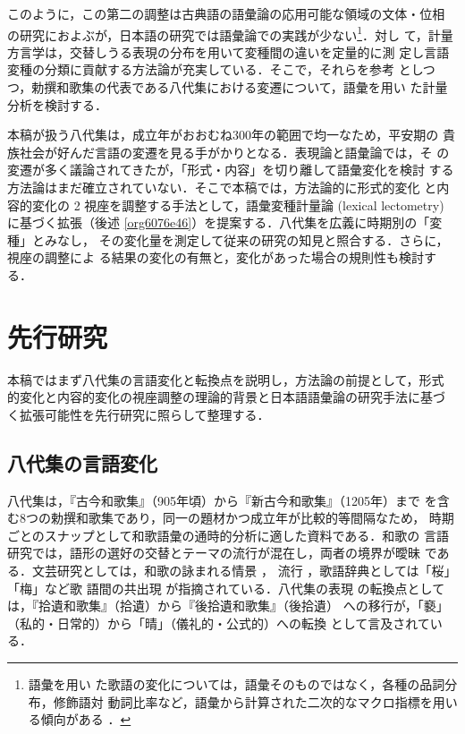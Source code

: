 \documentclass[submit]{ipsj}
\renewcommand{\ref}{\cref}
\begin{document}
このように，この第二の調整は古典語の語彙論の応用可能な領域の文体・位相
の研究におよぶが，日本語の研究では語彙論での実践が少ない\footnote{語彙を用い
た歌語の変化については，語彙そのものではなく，各種の品詞分布，修飾語対
動詞比率など，語彙から計算された二次的なマクロ指標を用いる傾向がある
\cite{tsuji1998Uta,nishihata1992Waka,hatano1941Waka}．}．対し
て，計量方言学は，交替しうる表現の分布を用いて変種間の違いを定量的に測
定し言語変種の分類に貢献する方法論が充実している．そこで，それらを参考
としつつ，勅撰和歌集の代表である八代集における変遷について，語彙を用い
た計量分析を検討する．

本稿が扱う八代集は，成立年がおおむね300年の範囲で均一なため，平安期の
貴族社会が好んだ言語の変遷を見る手がかりとなる．表現論と語彙論では，そ
の変遷が多く議論されてきたが，「形式・内容」を切り離して語彙変化を検討
する方法論はまだ確立されていない．そこで本稿では，方法論的に形式的変化
と内容的変化の 2 視座を調整する手法として，語彙変種計量論 (lexical
lectometry) \cite{Speelman2003Profilebased} に基づく拡張（後述
\ref{org6076e46}）を提案する．八代集を広義に時期別の「変種」とみなし，
その変化量を測定して従来の研究の知見と照合する．さらに，視座の調整によ
る結果の変化の有無と，変化があった場合の規則性も検討する．
\section{先行研究\label{org21fdd78}}
\label{sec:org00269d6}
本稿ではまず八代集の言語変化と転換点を説明し，方法論の前提として，形式
的変化と内容的変化の視座調整の理論的背景と日本語語彙論の研究手法に基づ
く拡張可能性を先行研究に照らして整理する．
\subsection{八代集の言語変化\label{org351c7bc}}
\label{sec:org7d04d99}
八代集は，『古今和歌集』（905年頃）から『新古今和歌集』（1205年）まで
を含む8つの勅撰和歌集であり，同一の題材かつ成立年が比較的等間隔なため，
時期ごとのスナップとして和歌語彙の通時的分析に適した資料である．和歌の
言語研究では，語形の選好の交替とテーマの流行が混在し，両者の境界が曖昧
である．文芸研究としては，和歌の詠まれる情景 \cite{ueno1976Koshui}，
流行 \cite{kawamura1991Sekkan}，歌語辞典としては「桜」「梅」など歌
語間の共出現 \cite{katagiri1983Uta} が指摘されている．八代集の表現
の転換点としては，『拾遺和歌集』（拾遺）から『後拾遺和歌集』（後拾遺）
への移行が，「褻」（私的・日常的）から「晴」（儀礼的・公式的）への転換
として言及されている\cite{ueno1976Koshui,kawamura1991Sekkan}．
\end{document}
